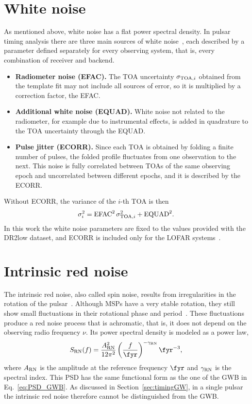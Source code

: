 \section{White noise} \label{sec:wn}

As mentioned above, white noise has a flat power spectral density. In pulsar
timing analysis there are three main sources of white noise~\cite{Taylor2021}, each described by
a parameter defined separately for every observing system, that is, every
combination of receiver and backend.
\begin{itemize}
    \item \textbf{Radiometer noise (EFAC).} The TOA uncertainty
    $\sigma_{{\rm TOA},i}$ obtained from the template fit may not include all
    sources of error, so it is multiplied by a correction factor, the EFAC.
    \item \textbf{Additional white noise (EQUAD).} White noise not related to
    the radiometer, for example due to instrumental effects, is added in
    quadrature to the TOA uncertainty through the EQUAD.
    \item \textbf{Pulse jitter (ECORR).} Since each TOA is obtained by folding a
    finite number of pulses, the folded profile fluctuates from one observation
    to the next. This noise is fully correlated between TOAs of the same
    observing epoch and uncorrelated between different epochs, and it is
    described by the ECORR.
\end{itemize}
Without ECORR, the variance of the $i$-th TOA is then
\begin{equation}
    \sigma_i^2 = \mathrm{EFAC}^2\,\sigma_{{\rm TOA},i}^2 + \mathrm{EQUAD}^2 .
    \label{eq:sigma_wn}
\end{equation}
In this work the white noise parameters are fixed to the values provided with
the DR2low dataset, and ECORR is included only for the LOFAR
systems~\cite{Iraci2025}.

\section{Intrinsic red noise} \label{sec:rn}

The intrinsic red noise, also called spin noise, results from irregularities in
the rotation of the pulsar~\cite{Shaifullah2025}. Although MSPs have a very stable rotation, they
still show small fluctuations in their rotational phase and period~\cite{Taylor2021}. These
fluctuations produce a red noise process that is achromatic, that is, it does
not depend on the observing radio frequency $\nu$. Its power spectral density is
modeled as a power law,
\begin{equation}
    S_{\rm RN}(f) = \frac{A_{\rm RN}^2}{12\pi^2}
    \left(\frac{f}{\fyr}\right)^{-\gamma_{\rm RN}}\fyr^{-3},
    \label{eq:PSD_RN}
\end{equation}
where $A_{\rm RN}$ is the amplitude at the reference frequency $\fyr$ and
$\gamma_{\rm RN}$ is the spectral index. This PSD has the same functional form
as the one of the GWB in Eq.~\eqref{eq:PSD_GWB}. As discussed in
Section~\ref{sec:timingGW}, in a single pulsar the intrinsic red noise therefore
cannot be distinguished from the GWB.

